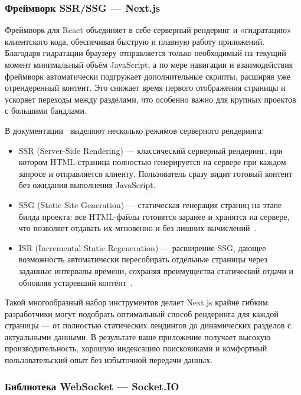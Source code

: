 \subsubsection*{Фреймворк SSR/SSG — Next.js}

Фреймворк для React объединяет в себе серверный рендеринг и «гидратацию» клиентского кода, обеспечивая быструю и плавную работу приложений. Благодаря гидратации браузеру отправляется только необходимый на текущий момент минимальный объём JavaScript, а по мере навигации и взаимодействия фреймворк автоматически подгружает дополнительные скрипты, расширяя уже отрендеренный контент. Это снижает время первого отображения страницы и ускоряет переходы между разделами, что особенно важно для крупных проектов с большими бандлами.

В документации~\cite{nextjs_ssr} выделяют несколько режимов серверного рендеринга:
\begin{itemize}
  \item SSR (Server-Side Rendering) — классический серверный рендеринг, при котором HTML-страница полностью генерируется на сервере при каждом запросе и отправляется клиенту. Пользователь сразу видит готовый контент без ожидания выполнения JavaScript.
  \item SSG (Static Site Generation) — статическая генерация страниц на этапе билда проекта: все HTML-файлы готовятся заранее и хранятся на сервере, что позволяет отдавать их мгновенно и без лишних вычислений~\cite{nextjs_ssg_isr}.
  \item ISR (Incremental Static Regeneration) — расширение SSG, дающее возможность автоматически пересобирать отдельные страницы через заданные интервалы времени, сохраняя преимущества статической отдачи и обновляя устаревший контент~\cite{nextjs_ssg_isr}.
\end{itemize}

Такой многообразный набор инструментов делает Next.js крайне гибким: разработчики могут подобрать оптимальный способ рендеринга для каждой страницы --- от полностью статических лендингов до динамических разделов с актуальными данными. В результате ваше приложение получает высокую производительность, хорошую индексацию поисковиками и комфортный пользовательский опыт без избыточной передачи данных.

\subsubsection*{Библиотека WebSocket — Socket.IO}

